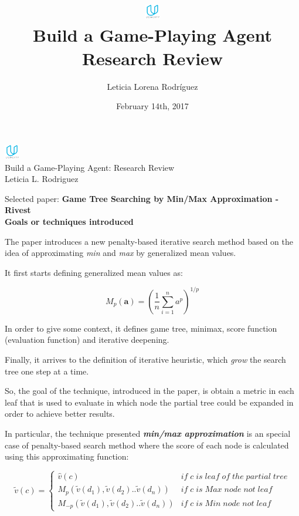 \documentclass[10pt, a4paper,english]{article}
\author{\normalsize{Leticia Lorena Rodr\'iguez}}
\date{\normalsize{February 14th, 2017}} %
\title{
	\includegraphics[width=0.05\textwidth]{udacity-small.png}\\
Build a Game-Playing Agent \\
\large {Research Review}
} %
\begin{document}
\begin{center}

\includegraphics[width=0.05\textwidth]{udacity-small.png}\\
Build a Game-Playing Agent: Research Review \\
Leticia L. Rodriguez \\
\end{center}

\noindent Selected paper: \textbf{Game Tree Searching by Min/Max Approximation - Rivest} \\

\noindent\textbf{Goals or techniques introduced}
\bigskip

The paper introduces a new penalty-based iterative search method based on the idea of approximating \textit{min} and \textit{max} by generalized mean values.

It first starts defining generalized mean values as:

\[
M_{p}(\textbf{a})=  \left(\dfrac{1}{n}\sum_{i=1}^{n}a^{p}\right)^{1/p}
\]

In order to give some context, it defines game tree, minimax, score function (evaluation function) and iterative deepening. 

Finally, it arrives to the definition of iterative heuristic, which \textit{grow} the search tree one step at a time.

So, the goal of the technique, introduced in the paper, is obtain a metric in each leaf that is used to evaluate in which node the partial tree could be expanded in order to achieve better results.  

In particular, the technique presented \textbf{\textit{min/max approximation}} is an special case of penalty-based search method where the score of each node is calculated using this approximating function: 

\[
\tilde{v}(c) =  \begin{cases}
						\hat{v}(c) 
                        & if\;c \;is\; leaf\; of\; the\; partial\; tree\\
                      	M_{p}(\tilde{v}(d_{1}),\tilde{v}(d_{2})..\tilde{v}(d_{n}))  
                        & if\; c\; is\; Max\; node\; not\; leaf\\
                     	M_{-p}(\tilde{v}(d_{1}),\tilde{v}(d_{2})..\tilde{v}(d_{n}))  
                        & if\; c\; is\; Min\; node\; not\; leaf
                        \end{cases}
\]
\end{document}
